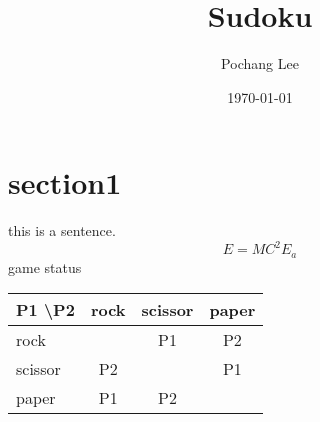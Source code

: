 \documentclass[24pt,a4paper]{article}
\begin{document}
	\title{Sudoku}
	\author{Pochang Lee}
	\date{\today}
	\maketitle
	\section{section1}
		this is a sentence.
\begin{equation}
E=MC^2
E_a
\end{equation}
game status
\begin{center}
\begin{tabular} {l | c | c | c}
	P1 \textbackslash P2 & rock & scissor & paper \\ \hline
	rock	&  & P1 & P2 \\ \hline
	scissor & P2 &  & P1 \\ \hline
	paper	& P1 & P2 & 

\end{tabular}
\end{center}
\end{document}
